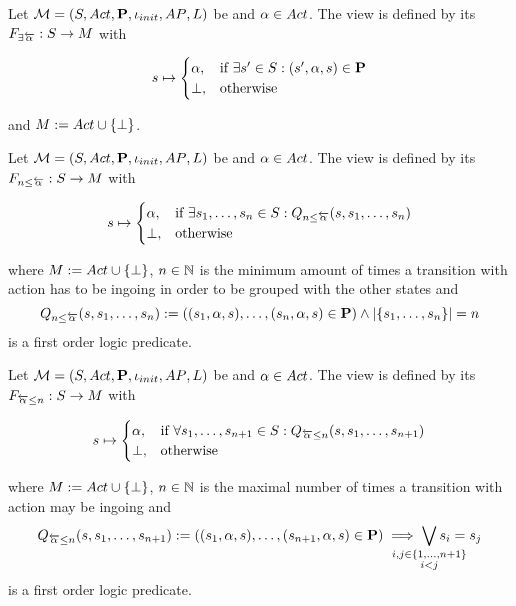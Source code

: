 \documentclass[preview]{standalone}
\begin{document}
\begin{definition}
	Let ${{{\mathcal{M}}}} = {{({S}, {Act}, {\textbf{P}}, {\iota_{init}}, {AP}, {L})}}$ be \achgphN and ${\alpha} \in {Act}$. The view \viewhasinaction is defined by its \grpfctN ${{F_{\exists{\overleftarrow{\ensuremath{{\alpha}}}}}}} : {S} \to {\ensuremath{{M}}}$ with 
	
	\[
	{s} \mapsto
	\begin{cases}
		{\alpha},				& \text{if } \exists {s}' \in {S}: ({s}', {\alpha}, {s}) \in {\ensuremath{{\textbf{P}}}} \\
		{\bot},          	& \text{otherwise}
	\end{cases}
	\]
	
	and ${{M}} := {Act} \cup {\{\bot\}}$.	
	\label{def:mininaction}
\end{definition}	


\begin{definition}
	Let ${{{\mathcal{M}}}} = {{({S}, {Act}, {\textbf{P}}, {\iota_{init}}, {AP}, {L})}}$ be \achgphN and ${\alpha} \in {Act}$. The view \viewmininaction is defined by its \grpfctN ${{F_{{n}\leq{\overleftarrow{\ensuremath{{\alpha}}}}}}} : {S} \to {M}$ with
	
	\[
	{s} \mapsto
	\begin{cases}
		{\alpha},				& \text{if } \exists {s}_1, \dots, {s}_{n} \in {S}:  {Q_{{n}\leq{\overleftarrow{\ensuremath{{\alpha}}}}}({s},{s}_1, \dots, {s}_{{n}})}\\
		{\bot},          	& \text{otherwise}
	\end{cases}
	\]
	
	where ${{M}} := {Act} \cup {\{\bot\}}$, ${n} \in {\mathbb{N}}$ is the minimum amount of times a transition with action \action has to be ingoing in order to be grouped with the other states and
	\[
	{Q_{{n}\leq{\overleftarrow{\ensuremath{{\alpha}}}}}({s},{s}_1, \dots, {s}_{{n}})} := (({s}_1, {\alpha}, {s}), \dots, ({s}_{n}, {\alpha}, {s}) \in {\ensuremath{{\textbf{P}}}}) \land |\{{s}_1, \dots, {s}_{n}\}| = {n}
	\]
	is a first order logic predicate.
	\label{def:viewmaxinaction}
\end{definition}

\begin{definition}
	Let ${{{\mathcal{M}}}} = {{({S}, {Act}, {\textbf{P}}, {\iota_{init}}, {AP}, {L})}}$ be \achgphN and ${\alpha} \in {Act}$. The view \viewmaxinaction is defined by its \grpfctN ${{F_{{\overleftarrow{{\alpha}}}\leq{n}}}} : {S} \to {M}$ with
	
	\[
	{s} \mapsto
	\begin{cases}
		{\alpha},				& \text{if } \forall {s}_1, \dots, {s}_{{n}+1} \in {S}: {Q_{{\overleftarrow{{\alpha}}}\leq{n}}({s},{s}_1, \dots, {s}_{{n}+1})} \\
		{\bot},          	& \text{otherwise}
	\end{cases}
	\]
	
	where ${{M}} := {Act} \cup {\{\bot\}}$, ${n} \in {\mathbb{N}}$ is the maximal number of times a transition with action \action may be ingoing and 
	\[
	\predmaxinact := ((\state_1, \action, \state), \dots, (\state_{\numinact+1}, \action, \state) \in \trans) \implies \bigvee_{\mathclap{\substack{i,j \in \{1,\dots, \numinact+1\} \\ i < j}}} \state_i = \state_j
	\]
	is a first order logic predicate.
\end{definition}
\end{document}
